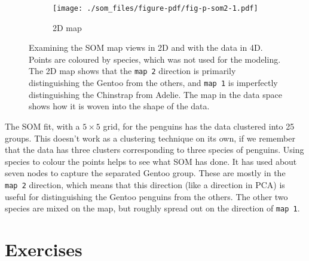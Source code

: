 \documentclass[
  letterpaper,
]{book}
\begin{document}
\begin{figure}

\begin{minipage}[t]{0.50\linewidth}

{\centering 

\begin{figure}

{\centering \texttt{[image: ./som\_files/figure-pdf/fig-p-som2-1.pdf]}

}

\caption{2D map}

\end{figure}

}

\end{minipage}%
%
\begin{minipage}[t]{0.50\linewidth}

{\centering 

}

\end{minipage}%

\caption{\label{fig-penguins-som}Examining the SOM map views in 2D and
with the data in 4D. Points are coloured by species, which was not used
for the modeling. The 2D map shows that the \texttt{map\ 2} direction is
primarily distinguishing the Gentoo from the others, and \texttt{map\ 1}
is imperfectly distinguishing the Chinstrap from Adelie. The map in the
data space shows how it is woven into the shape of the data.}

\end{figure}

The SOM fit, with a \(5\times 5\) grid, for the penguins has the data
clustered into 25 groups. This doesn't work as a clustering technique on
its own, if we remember that the data has three clusters corresponding
to three species of penguins. Using species to colour the points helps
to see what SOM has done. It has used about seven nodes to capture the
separated Gentoo group. These are mostly in the \texttt{map\ 2}
direction, which means that this direction (like a direction in PCA) is
useful for distinguishing the Gentoo penguins from the others. The other
two species are mixed on the map, but roughly spread out on the
direction of \texttt{map\ 1}.

\hypertarget{exercises-9}{%
\section*{Exercises}\label{exercises-9}}
\end{document}

